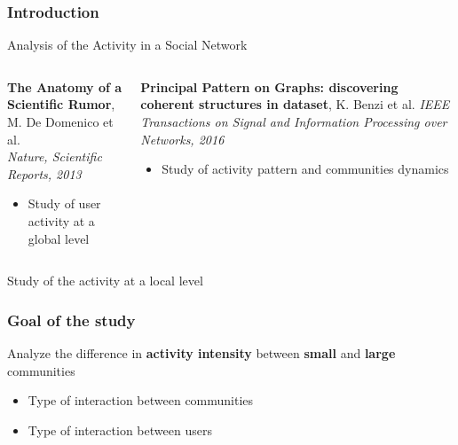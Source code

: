 \documentclass{beamer}
\begin{document}
\begin{frame}
\frametitle{Introduction}
{
\vspace{-0.3cm}
\centering
\begin{tcolorbox}[width=6cm, colframe=white, colback=white, halign=center]
\Large Analysis of the Activity in a Social Network
\end{tcolorbox}
}
	
\vspace{0.5cm}

\begin{columns}
	\begin{column}[T]{0.4\textwidth}
	\textbf{The Anatomy of a Scientific Rumor}, M. De Domenico et al. \\ \textit{Nature, Scientific Reports, 2013}
	\begin{itemize}
		\item Study of user activity at a global level
	\end{itemize}
	\end{column}

	\begin{column}[T]{0.55\textwidth}
	\textbf{Principal Pattern on Graphs: discovering coherent structures in dataset}, K. Benzi et al. \textit{IEEE Transactions on Signal and Information Processing over Networks, 2016}
	\begin{itemize}
		\item Study of activity pattern and communities dynamics
	\end{itemize}
	\end{column}
\end{columns}
\vspace{0.5cm}
{
\centering
\begin{tcolorbox}[width=8.5cm, colframe=blue, colback=white, halign=center]
\Large Study of the activity at a local level
\end{tcolorbox}
} 
\end{frame}

\begin{frame}
\frametitle{Goal of the study}
{
\centering
\begin{tcolorbox}[width=10cm, colframe=black, colback=white, halign=center]
\Large Analyze the difference in \textbf{activity intensity} between \textbf{small} and \textbf{large} communities
\end{tcolorbox}
} 

\begin{itemize}
	\setlength{\itemindent}{1cm}
	\vspace{0.5cm} \Large 
	\item \Large Type of interaction between communities
	\vspace{0.5cm} 
	\item \Large Type of interaction between users
\end{itemize}

\end{frame}
\end{document}
